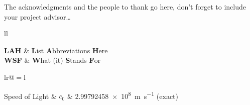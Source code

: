 \documentclass[
11pt, %
english, %
singlespacing, %
headsepline, %
]{style} %
\begin{document}

\begin{acknowledgements}
	\addchaptertocentry{\acknowledgementname} %
	The acknowledgments and the people to thank go here, don't forget to include your project advisor\ldots
\end{acknowledgements}


\tableofcontents %

\listoffigures %

\listoftables %


\begin{abbreviations}{ll} %

	\textbf{LAH} & \textbf{L}ist \textbf{A}bbreviations \textbf{H}ere\\
	\textbf{WSF} & \textbf{W}hat (it) \textbf{S}tands \textbf{F}or\\

\end{abbreviations}


\begin{constants}{lr@{${}={}$}l} %


	Speed of Light & $c_{0}$ & \SI{2.99792458e8}{\meter\per\second} (exact)\\

\end{constants}
\end{document}
